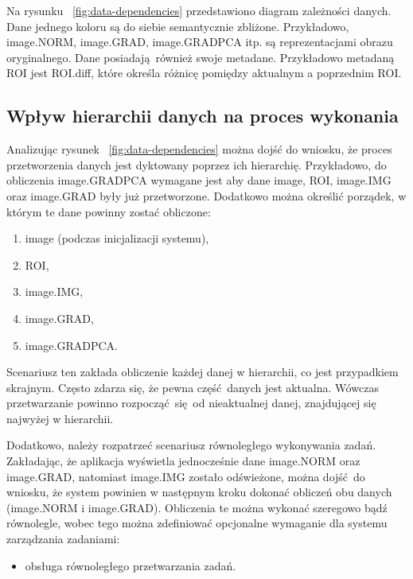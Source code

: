 
Na rysunku ~\ref{fig:data-dependencies} przedstawiono diagram zależności danych. Dane jednego koloru są do siebie semantycznie zbliżone. Przykładowo, image.NORM, image.GRAD, image.GRADPCA itp. są reprezentacjami obrazu oryginalnego. Dane posiadają również swoje metadane. Przykładowo metadaną ROI jest ROI.diff, które określa różnicę pomiędzy aktualnym a poprzednim ROI. 

\subsection{Wpływ hierarchii danych na proces wykonania}
Analizując rysunek ~\ref{fig:data-dependencies} można dojść do wniosku, że proces przetworzenia danych jest dyktowany poprzez ich hierarchię. Przykładowo, do obliczenia image.GRADPCA wymagane jest aby dane image, ROI, image.IMG oraz image.GRAD były już przetworzone. Dodatkowo można określić porządek, w którym te dane powinny zostać obliczone:

\begin{enumerate}[labelwidth=\widthof{\ref{last-item}},label=\arabic*.]
	\item image (podczas inicjalizacji systemu),
	\item ROI,
	\item image.IMG,
	\item image.GRAD,
	\item image.GRADPCA. \label{last-item}
\end{enumerate}

Scenariusz ten zakłada obliczenie każdej danej w hierarchii, co jest przypadkiem skrajnym. Często zdarza się, że pewna część danych jest aktualna. Wówczas przetwarzanie powinno rozpocząć się od nieaktualnej danej, znajdującej się najwyżej w hierarchii. 

Dodatkowo, należy rozpatrzeć scenariusz równoległego wykonywania zadań. Zakładając, że aplikacja wyświetla jednocześnie dane image.NORM oraz image.GRAD, natomiast image.IMG zostało odświeżone, można dojść do wniosku, że system powinien w następnym kroku dokonać obliczeń obu danych (image.NORM i image.GRAD). Obliczenia te można wykonać szeregowo bądź równolegle, wobec tego można zdefiniować opcjonalne wymaganie dla systemu zarządzania zadaniami:
\begin{itemize}
	\item obsługa równoległego przetwarzania zadań.
\end{itemize}